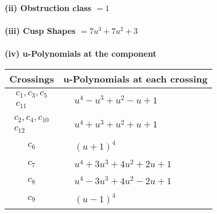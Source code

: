\documentclass[1p]{elsarticle_modified}
\theoremstyle{definition}
\begin{document}
\flushleft \textbf{(ii) Obstruction class $= 1$}\\~\\
\flushleft \textbf{(iii) Cusp Shapes $= 7 u^3+7 u^2+3$}\\~\\
\newpage\renewcommand{\arraystretch}{1}
\flushleft \textbf{(iv) u-Polynomials at the component}\newline \\
\begin{tabular}{m{50pt}|m{274pt}}
Crossings & \hspace{64pt}u-Polynomials at each crossing \\
\hline $$\begin{aligned}c_{1},c_{3},c_{5}\\c_{11}\end{aligned}$$&$\begin{aligned}
&u^4- u^3+u^2- u+1
\end{aligned}$\\
\hline $$\begin{aligned}c_{2},c_{4},c_{10}\\c_{12}\end{aligned}$$&$\begin{aligned}
&u^4+u^3+u^2+u+1
\end{aligned}$\\
\hline $$\begin{aligned}c_{6}\end{aligned}$$&$\begin{aligned}
&(u+1)^4
\end{aligned}$\\
\hline $$\begin{aligned}c_{7}\end{aligned}$$&$\begin{aligned}
&u^4+3 u^3+4 u^2+2 u+1
\end{aligned}$\\
\hline $$\begin{aligned}c_{8}\end{aligned}$$&$\begin{aligned}
&u^4-3 u^3+4 u^2-2 u+1
\end{aligned}$\\
\hline $$\begin{aligned}c_{9}\end{aligned}$$&$\begin{aligned}
&(u-1)^4
\end{aligned}$\\
\hline
\end{tabular}\\~\\
\end{document}
